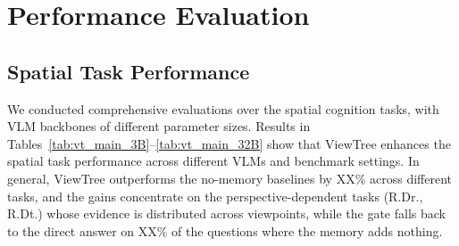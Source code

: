 \section{Performance Evaluation}
\label{sec:evaluation}

\subsection{Spatial Task Performance}
\label{sec:main_results}

We conducted comprehensive evaluations over the spatial cognition tasks, with VLM backbones of different parameter sizes. Results in Tables~\ref{tab:vt_main_3B}--\ref{tab:vt_main_32B} show that ViewTree enhances the spatial task performance across different VLMs and benchmark settings. In general, ViewTree outperforms the no-memory baselines by XX\% across different tasks, and the gains concentrate on the perspective-dependent tasks (R.Dr., R.Dt.) whose evidence is distributed across viewpoints, while the gate falls back to the direct answer on XX\% of the questions where the memory adds nothing.

\begin{table}[h!]
	\centering
	\caption{Performance with Qwen2.5-VL-3B. Task acronyms are defined in Section~\ref{sec:experiment_setting}.}
	\vspace{-0.2in}
	\label{tab:vt_main_3B}
\end{table}

